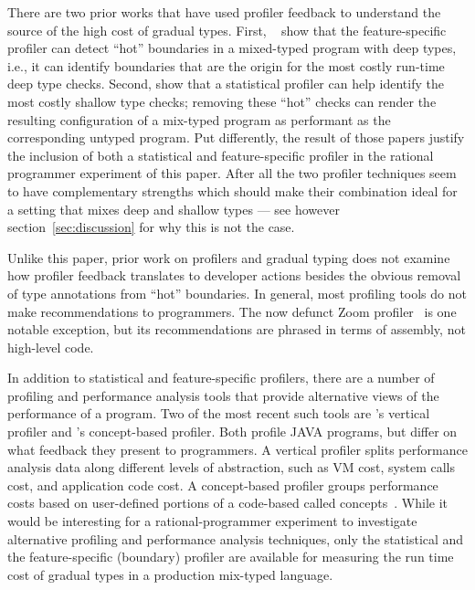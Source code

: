 There are two prior works that have used profiler feedback to understand
the source of the high cost of gradual types.  First,
~\citet{astavf-feature-prf} show that the feature-specific profiler can detect
``hot'' boundaries in a mixed-typed program with deep types, i.e., it can
identify boundaries that are the origin for the most costly run-time deep
type checks. Second, \cite{grmhn-vmil-2019} show that a statistical
profiler can help identify the most costly shallow type checks; removing
these ``hot'' checks can render the resulting configuration of a mix-typed
program as performant as the corresponding untyped program.  Put
differently, the result of those papers justify the inclusion of both a
statistical and feature-specific profiler in the rational programmer experiment of
this paper.  After all the two profiler techniques seem to have
complementary strengths which should make their combination ideal for a
setting that mixes deep and shallow types --- see however
section~\ref{sec:discussion} for why this is not the case. 

Unlike this paper, prior work on profilers and gradual typing does not
examine how profiler feedback translates to developer actions
besides the obvious removal of type annotations from ``hot'' boundaries. 
In general, most profiling tools do not make recommendations to
programmers. The now defunct Zoom profiler~\cite{zoom} is one
notable exception, but its recommendations are phrased in 
terms of assembly, not high-level code.  

In addition to statistical and feature-specific profilers, there are a
number of profiling and performance analysis tools that provide
alternative views of the performance of a program. Two of the most recent
such tools are \citet{vertical-profiler}'s vertical profiler and
\citet{java-profile-concepts}'s concept-based profiler. Both profile JAVA
programs, but differ on what feedback they present to programmers. A
vertical profiler splits performance analysis data   along different
levels of abstraction, such as VM cost, system calls cost, and application
code cost. A concept-based profiler groups performance costs based on
user-defined portions of a code-based called concepts~\cite{concepts}.
While it would be interesting for a rational-programmer experiment to
investigate alternative profiling and performance analysis
techniques, only the statistical and the feature-specific (boundary)
profiler are available for measuring the run time cost of gradual
types in a production mix-typed language.








